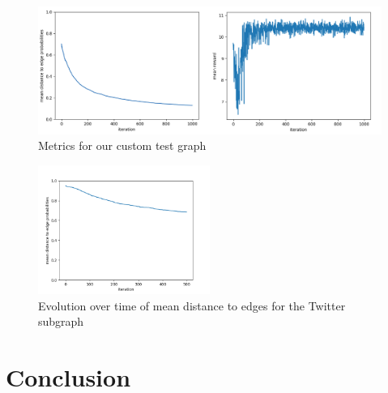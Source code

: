 \documentclass[a4paper,12pt]{article}
\begin{document}
 \begin{figure}
  \centering
    \includegraphics[width=\textwidth]{total_test.png}
      \caption{Metrics for our custom test graph}
        \label{fig:fig2}
\end{figure}

 \begin{figure}
  \centering
    \includegraphics[width=0.5\textwidth]{conv_weights_twitter.png}
      \caption{Evolution over time of mean distance to edges for the Twitter subgraph}
        \label{fig:fig3}
\end{figure}



\section{Conclusion}



\newpage



\end{document}
